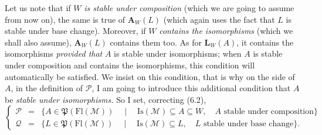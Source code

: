 \documentclass[11pt]{article}
\newcommand{\msp}[1]{\marginpar{\footnotesize [#1]}}
\newcommand{\Fl}{\mathrm{Fl}}
\newcommand{\Pf}{\mathfrak{P}}
\begin{document}
\msp{page 86}Let us note that if $W$ \textit{is stable under composition} (which we are going to assume from now on), the same is true of $\mathbf{A}_W(L)$ (which again uses the fact that $L$ is stable under base change). Moreover, if $W$ \textit{contains the isomorphisms} (which we shall also assume), $\mathbf{A}_W(L)$ contains them too. As for $\mathbf{L}_W(A)$, it contains the isomorphisms \textit{provided that} $A$ is stable under isomorphisms; when $A$ is stable under composition and contains the isomorphisms, this condition will automatically be satisfied. We insist on this condition, that is why on the side of $A$, in the definition of $\mathcal{P}$, I am going to introduce this additional condition that $A$ be \textit{stable under isomorphisms.} So I set, correcting (6.2),
\[
\left\{
\begin{array}{rcl}
\mathcal{P} & = & \{A\in\Pf(\Fl(\mathcal{M}))\quad\mid\quad\mathrm{Is}(\mathcal{M})\subseteq A\subseteq W,\quad A\text{ stable under composition}\}\\[1ex]
\mathcal{Q} & = & \{L\in\Pf(\Fl(\mathcal{M}))\quad\mid\quad\mathrm{Is}(\mathcal{M})\subseteq L,\quad L\text{ stable under base change}\}.
\end{array}
\right.
\tag*{(6.7)}
\]
\end{document}
